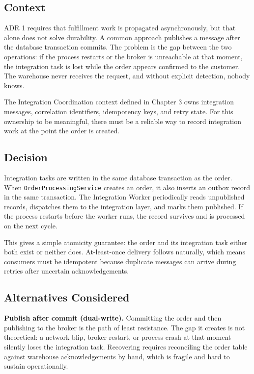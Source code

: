\subsection{Context}

ADR 1 requires that fulfillment work is propagated asynchronously, but that alone does not
solve durability. A common approach publishes a message after the database transaction commits.
The problem is the gap between the two operations: if the process restarts or the broker is
unreachable at that moment, the integration task is lost while the order appears confirmed to
the customer. The warehouse never receives the request, and without explicit detection, nobody
knows.

The Integration Coordination context defined in Chapter 3 owns integration messages,
correlation identifiers, idempotency keys, and retry state. For this ownership to be
meaningful, there must be a reliable way to record integration work at the point the order is
created.

\subsection{Decision}

Integration tasks are written in the same database transaction as the order. When
\texttt{OrderProcessingService} creates an order, it also inserts an outbox record in the same
transaction. The Integration Worker periodically reads unpublished records, dispatches them to
the integration layer, and marks them published. If the process restarts before the worker
runs, the record survives and is processed on the next cycle.

This gives a simple atomicity guarantee: the order and its integration task either both exist
or neither does. At-least-once delivery follows naturally, which means consumers must be
idempotent because duplicate messages can arrive during retries after uncertain acknowledgements.

\subsection{Alternatives Considered}

\textbf{Publish after commit (dual-write).} Committing the order and then publishing to the
broker is the path of least resistance. The gap it creates is not theoretical: a network blip,
broker restart, or process crash at that moment silently loses the integration task. Recovering
requires reconciling the order table against warehouse acknowledgements by hand, which is
fragile and hard to sustain operationally.


